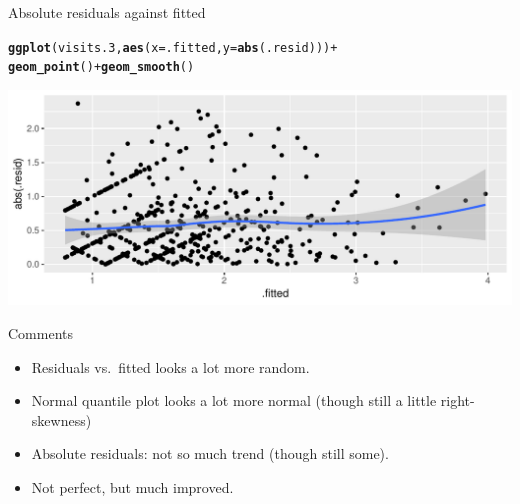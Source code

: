 \documentclass[unknownkeysallowed]{beamer}\usepackage[]{graphicx}\usepackage[]{color}
\makeatletter
\def\maxwidth{ %
  \ifdim\Gin@nat@width>\linewidth
    \linewidth
  \else
    \Gin@nat@width
  \fi
}
\newcommand{\hlopt}[1]{\textcolor[rgb]{0,0,0}{#1}}%
\newcommand{\hlstd}[1]{\textcolor[rgb]{0.345,0.345,0.345}{#1}}%
\newcommand{\hlkwc}[1]{\textcolor[rgb]{0.333,0.667,0.333}{#1}}%
\newcommand{\hlkwd}[1]{\textcolor[rgb]{0.737,0.353,0.396}{\textbf{#1}}}%
\newenvironment{kframe}{%
 \def\at@end@of@kframe{}%
 \ifinner\ifhmode%
  \def\at@end@of@kframe{\end{minipage}}%
  \begin{minipage}{\columnwidth}%
 \fi\fi%
 \def\FrameCommand##1{\hskip\@totalleftmargin \hskip-\fboxsep
 \colorbox{shadecolor}{##1}\hskip-\fboxsep
     \hskip-\linewidth \hskip-\@totalleftmargin \hskip\columnwidth}%
 \MakeFramed {\advance\hsize-\width
   \@totalleftmargin\z@ \linewidth\hsize
   \@setminipage}}%
 {\par\unskip\endMakeFramed%
 \at@end@of@kframe}
\newenvironment{knitrout}{}{} %
\makeatother
\begin{document}
\begin{frame}[fragile]{Absolute residuals against fitted}
  
\begin{knitrout}
\color{fgcolor}\begin{kframe}
\begin{alltt}
\hlkwd{ggplot}\hlstd{(visits.3,}\hlkwd{aes}\hlstd{(}\hlkwc{x}\hlstd{=.fitted,}\hlkwc{y}\hlstd{=}\hlkwd{abs}\hlstd{(.resid)))}\hlopt{+}
  \hlkwd{geom_point}\hlstd{()}\hlopt{+}\hlkwd{geom_smooth}\hlstd{()}
\end{alltt}


{\ttfamily\noindent\itshape{}}\end{kframe}
\includegraphics[width=\maxwidth]{figure/unnamed-chunk-35-1} 

\end{knitrout}
  
\end{frame}

\begin{frame}[fragile]{Comments}
  
  \begin{itemize}
  \item Residuals vs.\ fitted looks a lot more random.
  \item Normal quantile plot looks a lot more normal (though still a
    little right-skewness)
  \item Absolute residuals: not so much trend (though still some).
  \item Not perfect, but much improved.
  \end{itemize}
  
\end{frame}
\end{document}
